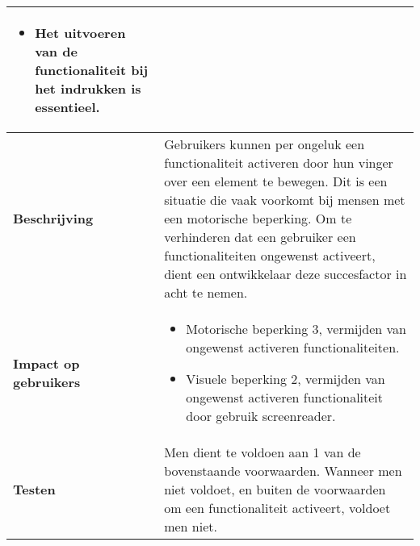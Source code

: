 \begin{table}[H]
\begin{tabular}{|l|p{12cm}|}
\begin{itemize}
            \item Het uitvoeren van de functionaliteit bij het indrukken is essentieel.
        \end{itemize}                                                                                                 \\ 
        \hline
        \textbf{Beschrijving}                 & Gebruikers kunnen per ongeluk een functionaliteit activeren door hun vinger over een element te bewegen. Dit is een situatie die vaak voorkomt bij mensen met een motorische beperking. Om te verhinderen dat een gebruiker een functionaliteiten ongewenst activeert,  dient een ontwikkelaar deze succesfactor in acht te nemen.  \\ 
        \hline
        \textbf{Impact op gebruikers}         &  
        \begin{itemize}
            \item Motorische beperking 3, vermijden van ongewenst activeren functionaliteiten.
               \item Visuele beperking 2, vermijden van ongewenst activeren functionaliteit door gebruik screenreader.
            
            
        \end{itemize}                                                                                                                                                                                                                                                                                                                                                                                                                                                               \\ 
        \hline
        \textbf{Testen}                       & Men dient te voldoen aan 1 van de bovenstaande voorwaarden. Wanneer men niet voldoet, en buiten de voorwaarden om een functionaliteit activeert, voldoet men niet.                                                                                                            \\
        \hline
    \end{tabular}
    
\end{table}
\newpage
